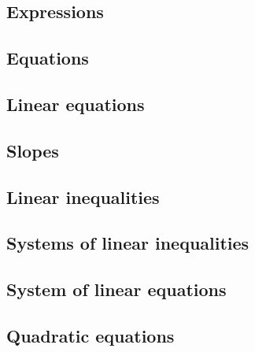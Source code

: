 \documentclass{article}
\begin{document}
\subsection{Expressions}
\vspace{\fill}
\vspace{\fill}
\pagebreak

\subsection{Equations}
\vspace{\fill}
\vspace{\fill}
\pagebreak

\subsection{Linear equations}
\pagebreak

\subsection{Slopes}
\pagebreak

\subsection{Linear inequalities}
\pagebreak

\subsection{Systems of linear inequalities}
\pagebreak

\subsection{System of linear equations}


\pagebreak

\subsection{Quadratic equations}
\end{document}
